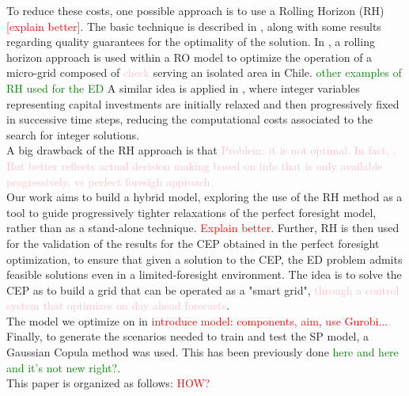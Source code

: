\indent To reduce these costs, one possible approach is to use a Rolling Horizon (RH) \textcolor{red}{[explain better]}. The basic technique is described in \textcolor{green}{\cite{INTRO_Glomb}}, along with some results regarding quality guarantees for the optimality of the solution. In \textcolor{green}{\cite{INTRO_Palma-Behnke}}, a rolling horizon approach is used within a RO model to optimize the operation of a micro-grid composed of \textcolor{pink}{check} serving an isolated area in Chile. \textcolor{Green}{other examples of RH used for the ED} A similar idea is applied in \textcolor{green}{\cite{INTRO_karlsruhe}}, where integer variables representing capital investments are initially relaxed and then progressively fixed in successive time steps, reducing the computational costs associated to the search for integer solutions.\\
\indent A big drawback of the RH approach is that \textcolor{pink}{Problem: it is not optimal. In fact, \cite{INTRO_short-term}. But better reflects actual decision making based on info that is only available progressively, vs perfect foresigh approach.}\\
\indent Our work aims to build a hybrid model, exploring the use of the RH method as a tool to guide progressively tighter relaxations of the perfect foresight model, rather than as a stand-alone technique.  \textcolor{red}{Explain better}. 
Further, RH is then used for the validation of the results for the CEP obtained in the perfect foresight optimization, to ensure that given a solution to the CEP, the ED problem admits feasible solutions even in a limited-foresight environment. The idea is to solve the CEP as to build a grid that can be operated as a "smart grid", \textcolor{pink}{through a control system that optimizes on day ahead forecasts}.\\
\indent The model we optimize on in \textcolor{red}{introduce model: components, aim, use Gurobi...}\\
\indent Finally, to generate the scenarios needed to train and test the SP model, a Gaussian Copula method was used. This has been previously done \textcolor{Green}{here and here and it's not new right?}.\\

This paper is organized as follows: \textcolor{red}{HOW?}\\

